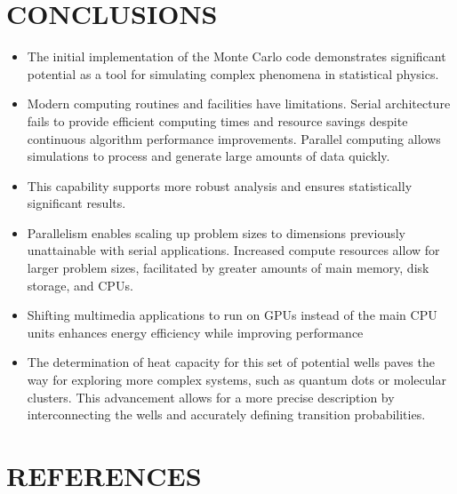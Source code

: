 \documentclass[%
 reprint,
 amsmath,amssymb,
 aps,
]{revtex4-2}
\begin{document}
\section{CONCLUSIONS}
\begin{itemize}
    \item The initial implementation of the Monte Carlo code demonstrates significant potential as a tool for simulating complex phenomena in statistical physics.

    \item Modern computing routines and facilities have limitations. Serial architecture fails to provide efficient computing times and resource savings despite continuous algorithm performance improvements. Parallel computing allows simulations to process and generate large amounts of data quickly.
    \item This capability supports more robust analysis and ensures statistically significant results.

    \item Parallelism enables scaling up problem sizes to dimensions previously unattainable with serial applications. Increased compute resources allow for larger problem sizes, facilitated by greater amounts of main memory, disk storage, and CPUs.

    \item Shifting multimedia applications to run on GPUs instead of the main CPU units enhances energy efficiency while improving performance

    \item The determination of heat capacity for this set of potential wells paves the way for exploring more complex systems, such as quantum dots or molecular clusters. This advancement allows for a more precise description by interconnecting the wells and accurately defining transition probabilities.

\end{itemize}

\section{REFERENCES}
\nocite{*}
%
\end{document}
